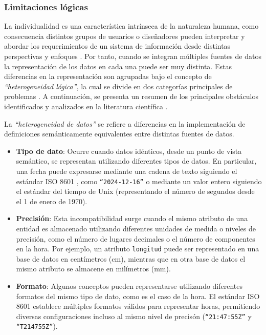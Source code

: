     \subsubsection{Limitaciones l\'ogicas}

        La individualidad es una característica intrínseca de la naturaleza humana,
        como consecuencia distintos grupos de usuarios o diseñadores pueden interpretar y
        abordar los requerimientos de un sistema de información desde distintas perspectivas y enfoques \cite{doan2012principles, halevy2006data}. Por tanto, cuando se integran
        múltiples fuentes de datos la representación de los datos en cada una puede ser muy distinta.
        Estas diferencias en la representación son agrupadas bajo el concepto de \textit{``heterogeneidad lógica''}, la cual se divide en dos categorías principales
        de problemas \cite{hakimpour2001resolving}. A continuación, se presenta un resumen de los principales obstáculos identificados y analizados en la literatura científica \cite{Batini1986, breitbart1986database, breitbart1990multidatabase, reddy1994methodology, halevy2006data, hakimpour2001resolving}.

        La \textit{``heterogeneidad de datos''} se refiere a diferencias en la implementación de definiciones semánticamente equivalentes entre distintas fuentes de datos. 

        \begin{itemize}
            \item \textbf{Tipo de dato}: Ocurre cuando datos idénticos, desde un punto de vista semántico, se representan
            utilizando diferentes tipos de datos. En particular, una fecha puede expresarse mediante una cadena de texto siguiendo
            el estándar ISO 8601 \cite{iso8601}, como \texttt{``2024-12-16''} o 
            mediante un valor entero siguiendo el estándar del tiempo de Unix \cite{unix_time_wiki} (representando el número de segundos desde el 1 de enero de 1970).
            \item \textbf{Precisión}: Esta incompatibilidad surge cuando el mismo atributo de una entidad es almacenado utilizando 
            diferentes unidades de medida o niveles de precisión, como el número de lugares decimales o el número de componentes en la hora. Por ejemplo, un atributo \texttt{longitud}
            puede ser representado en una base de datos en centímetros (cm), mientras que en otra base de datos el mismo atributo se almacene en milímetros (mm).
            \item \textbf{Formato}: Algunos conceptos pueden representarse utilizando diferentes formatos del mismo tipo de dato, como es el caso de la hora. 
            El estándar ISO 8601 establece múltiples formatos válidos para representar horas, permitiendo diversas configuraciones incluso al mismo nivel
            de precisón (\texttt{``21:47:55Z''} y \texttt{``T214755Z''}).
        \end{itemize}

